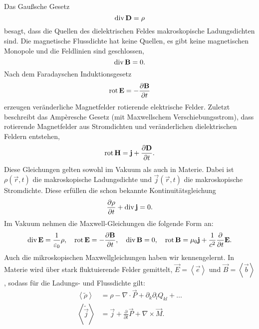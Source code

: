 Das Gaußsche Gesetz
\begin{equation*}
	\operatorname{div} \mathbf{D}=\rho
\end{equation*}
besagt, dass die Quellen des dielektrischen Feldes makroskopische Ladungsdichten sind. Die magnetische Flussdichte hat keine Quellen, es gibt keine magnetischen Monopole und die Feldlinien sind geschlossen,
\begin{equation*}
	\operatorname{div} \mathbf{B}=0.
\end{equation*}
Nach dem Faradayschen Induktionsgesetz
\begin{equation*}
	\operatorname{rot} \mathbf{E}=-\frac{\partial \mathbf{B}}{\partial t}
\end{equation*}
erzeugen veränderliche Magnetfelder rotierende elektrische Felder. Zuletzt beschreibt das Ampèresche Gesetz (mit Maxwellschem Verschiebungsstrom), dass rotierende Magnetfelder aus Stromdichten und veränderlichen dielektrischen Feldern entstehen,
\begin{equation*}
	\operatorname{rot} \mathbf{H}=\mathbf{j}+\frac{\partial \mathbf{D}}{\partial t}.
\end{equation*}
Diese Gleichungen gelten sowohl im Vakuum als auch in Materie. Dabei ist $\rho \left(\vec {r},t\right)$ die makroskopische Ladungsdichte und $\vec {j}\left(\vec {r},t\right)$ die makroskopische Stromdichte. Diese erfüllen die schon bekannte Kontinuitätsgleichung
\begin{equation*}
	\frac{\partial \rho }{\partial t}+\operatorname{div} \mathbf{j}=0.
\end{equation*}
Im Vakuum nehmen die Maxwell-Gleichungen die folgende Form an:
\begin{equation*}
	\operatorname{div} \mathbf{E}=\frac{1}{\varepsilon _{0}}\rho ,\quad \operatorname{rot} \mathbf{E}=-\frac{\partial \mathbf{B}}{\partial t},\quad \operatorname{div} \mathbf{B}=0,\quad \operatorname{rot} \mathbf{B}=\mu _{0}\mathbf{j}+\frac{1}{c^{2}}\frac{\partial }{\partial t}\mathbf{E}.
\end{equation*}
Auch die mikroskopischen Maxwellgleichungen haben wir kennengelernt. In Materie wird über stark fluktuierende Felder gemittelt, $\vec {E}=\left\langle \vec {e}\right\rangle $ und $\vec {B}=\left\langle \vec {b}\right\rangle $, sodass für die Ladungs- und Flussdichte gilt:
\begin{align*}
	\left\langle \tilde{\rho }\right\rangle    & =\rho -\nabla \cdot \vec {P}+\partial _{k}\partial _{l}Q_{kl}+\ldots  \\
	\left\langle \tilde{\vec {j}}\right\rangle & =\vec {j}+\frac{\partial }{\partial t}\vec {P}+\nabla \times \vec {M}.
\end{align*}
